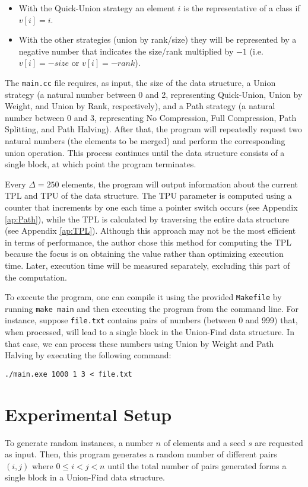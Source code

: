 \begin{itemize}
    \item With the Quick-Union strategy an element $i$ is the representative of a class if $v[i] = i$.
    \item With the other strategies (union by rank/size) they will be represented by a negative number that indicates the size/rank multiplied by $-1$ (i.e. $v[i] = -size$ or $v[i] = -rank$).
\end{itemize}

The \texttt{main.cc} file requires, as input, the size of the data structure, a Union strategy (a natural number between 0 and 2, representing Quick-Union, Union by Weight, and Union by Rank, respectively), and a Path strategy (a natural number between 0 and 3, representing No Compression, Full Compression, Path Splitting, and Path Halving). After that, the program will repeatedly request two natural numbers (the elements to be merged) and perform the corresponding union operation. This process continues until the data structure consists of a single block, at which point the program terminates.

Every $\Delta = 250$ elements, the program will output information about the current TPL and TPU of the data structure. The TPU parameter is computed using a counter that increments by one each time a pointer switch occurs (see Appendix \ref{ap:Path}), while the TPL is calculated by traversing the entire data structure (see Appendix \ref{ap:TPL}). Although this approach may not be the most efficient in terms of performance, the author chose this method for computing the TPL because the focus is on obtaining the value rather than optimizing execution time. Later, execution time will be measured separately, excluding this part of the computation.

To execute the program, one can compile it using the provided \texttt{Makefile} by running \texttt{make main} and then executing the program from the command line. For instance, suppose \texttt{file.txt} contains pairs of numbers (between 0 and 999) that, when processed, will lead to a single block in the Union-Find data structure. In that case, we can process these numbers using Union by Weight and Path Halving by executing the following command:

\texttt{./main.exe 1000 1 3 < file.txt}

\section{Experimental Setup}
To generate random instances, a number \( n \) of elements and a seed \( s \) are requested as input. Then, this program generates a random number of different pairs \( (i, j) \) where \( 0 \leq i < j < n \) until the total number of pairs generated forms a single block in a Union-Find data structure. 

